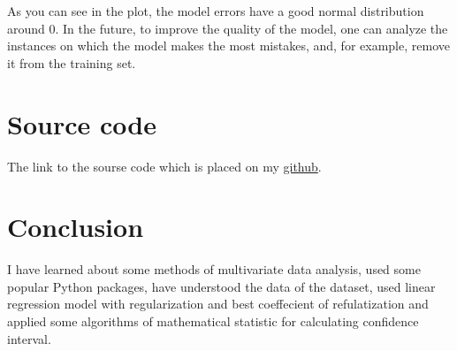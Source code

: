 \documentclass[%
12pt, %
final, %
oneside, %
onecolumn, %
centertags]{article} %
\theoremstyle{plain}
\theoremstyle{definition}
\theoremstyle{remark}
\begin{document}
As you can see in the plot, the model errors have a good normal distribution around $0$. In the future, to improve the quality of the model, one can analyze the instances on which the model makes the most mistakes, and, for example, remove it from the training set.

\section{Source code}

The link to the sourse code which is placed on my \href{https://github.com/aptmess/MMA/}{github}.

\section{Conclusion}

I have learned about some methods of multivariate data analysis, used some popular Python packages, have understood the data of the dataset, used linear regression model with regularization and best coeffecient of refulatization and applied some algorithms of mathematical statistic for calculating confidence interval. 
\end{document}
